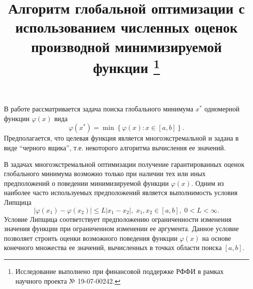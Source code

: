 \documentclass[11pt, oneside, a4paper]{article}
\begin{document}
\setcounter{page}{1}



\title{
Алгоритм глобальной оптимизации с использованием численных оценок производной минимизируемой функции
\footnote{Исследование выполнено при финансовой поддержке РФФИ в рамках научного проекта № 19-07-00242.}
}





\bigskip

В работе рассматривается задача поиска глобального минимума $x^*$ одномерной функции $\varphi(x)$ вида
\begin{equation}\label{problem}
\varphi(x^*)=\min\left\{\varphi(x):x\in\left[a,b\right]\right\}.
\end{equation}
Предполагается, что целевая функция является многоэкстремальной и задана в виде ``черного ящика'', т.е. некоторого алгоритма вычисления ее значений. 

В задачах многоэкстремальной оптимизации получение гарантированных оценок глобального минимума возможно только при наличии тех или иных предположений о поведении минимизируемой функции $\varphi(x)$. Одним из наиболее часто используемых предположений является выполнимость условия Липщица
\[
\left|\varphi(x_1)-\varphi(x_2)\right|\leq L\left|x_1-x_2\right|,\; x_1,x_2 \in [a,b],\; 0<L<\infty.
\]
Условие Липщица соответствует предположению ограниченности изменения значения функции при ограниченном изменении ее аргумента. Данное условие позволяет строить оценки возможного поведения функции $\varphi(x)$ на основе конечного множества ее значений, вычисленных в точках области поиска $[a,b]$.
\end{document}
